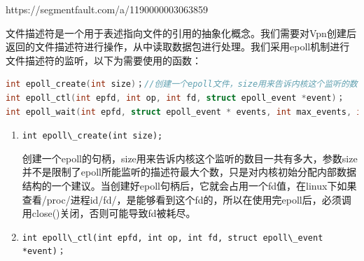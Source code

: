 \documentclass[format=final, language=chinese, degree=bachelor]{hustthesis}
\begin{document}
https://segmentfault.com/a/1190000003063859

文件描述符是一个用于表述指向文件的引用的抽象化概念。我们需要对Vpn创建后返回的文件描述符进行操作，从中读取数据包进行处理。我们采用epoll机制进行文件描述符的监听，以下为需要使用的函数：

\begin{lstlisting}[language=c]
int epoll_create(int size)；//创建一个epoll文件，size用来告诉内核这个监听的数目一共有多大
int epoll_ctl(int epfd, int op, int fd, struct epoll_event *event)；
int epoll_wait(int epfd, struct epoll_event * events, int max_events, int timeout);
\end{lstlisting}

\begin{enumerate}
\item \lstinline {int epoll\_create(int size); }

创建一个epoll的句柄，size用来告诉内核这个监听的数目一共有多大，参数size并不是限制了epoll所能监听的描述符最大个数，只是对内核初始分配内部数据结构的一个建议。当创建好epoll句柄后，它就会占用一个fd值，在linux下如果查看/proc/进程id/fd/，是能够看到这个fd的，所以在使用完epoll后，必须调用close()关闭，否则可能导致fd被耗尽。

\item
\lstinline {int epoll\_ctl(int epfd, int op, int fd, struct epoll\_event *event)；}


\end{enumerate}
\end{document}
